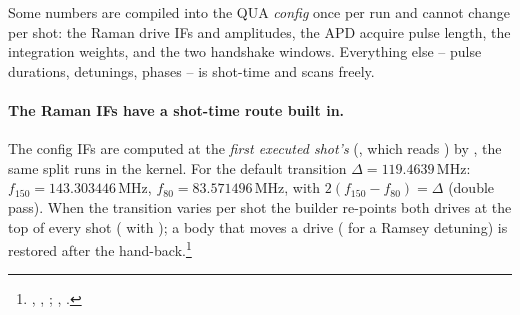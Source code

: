 Some numbers are compiled into the QUA \emph{config} once per run and cannot
change per shot: the Raman drive IFs and amplitudes, the APD acquire pulse
length, the integration weights, and the two handshake windows. Everything
else -- pulse durations, detunings, phases -- is shot-time and scans freely.

\paragraph{The Raman IFs have a shot-time route built in.} The config IFs are
computed at the \emph{first executed shot's} 
(, which reads ) by
, the same 
split  runs in the kernel. For the default transition
$\Delta = 119.4639$\,MHz: $f_{150} = 143.303446$\,MHz, $f_{80} =
83.571496$\,MHz, with $2(f_{150} - f_{80}) = \Delta$ (double pass). When the
transition varies per shot the builder re-points both drives at the top of
every shot ( with ); a body that moves
a drive ( for a Ramsey detuning) is restored after
the hand-back.\footnote{, ,
; ,
.}

